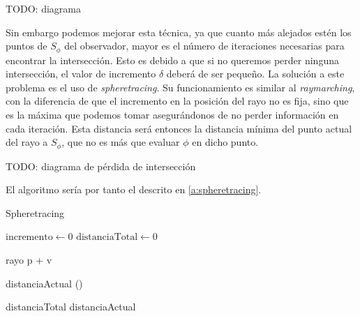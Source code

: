 TODO: diagrama

Sin embargo podemos mejorar esta técnica, ya que cuanto más alejados estén los puntos de $S_\phi$ del observador, mayor es el número de iteraciones necesarias para encontrar la intersección. Esto es debido a que si no queremos perder ninguna intersección, el valor de incremento $\delta$ deberá de ser pequeño. La solución a este problema es el uso de \textit{spheretracing}. Su funcionamiento es similar al \textit{raymarching}, con la diferencia de que el incremento en la posición del rayo no es fija, sino que es la máxima que podemos tomar asegurándonos de no perder información en cada iteración. Esta distancia será entonces la distancia mínima del punto actual del rayo a $S_\phi$, que no es más que evaluar $\phi$ en dicho punto.\newline

TODO: diagrama de pérdida de intersección

El algoritmo sería por tanto el descrito en \autoref{a:spheretracing}. 
\begin{algorithm}[hbt!]\label{a:spheretracing}
    \caption{Spheretracing}\label{alg:spheretracing}
    $\text{incremento} \gets 0$\;
    $\text{distanciaTotal} \gets 0$\;
    
     {
        rayo \gets p + \cdot v\;
        
        distanciaActual \gets \phi()\;
        

        distanciaTotal \mathrel{{+}{=}} distanciaActual\;

    }
\end{algorithm}


